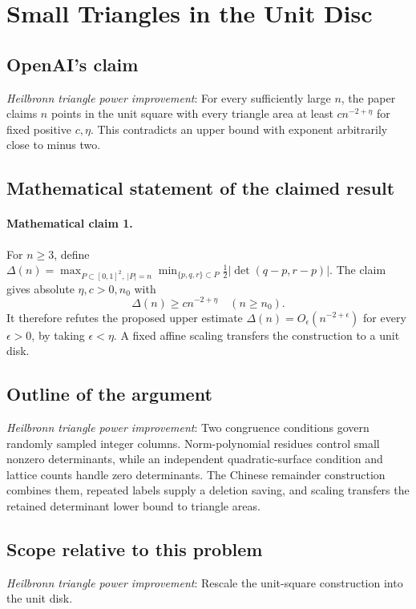 \documentclass[11pt]{article}
\begin{document}
\section*{Small Triangles in the Unit Disc}

\subsection{OpenAI's claim}
\textit{Heilbronn triangle power improvement}: For every sufficiently large $n$, the paper claims $n$ points in the unit square with every triangle area at least $c n^{-2+\eta}$ for fixed positive $c,\eta$. This contradicts an upper bound with exponent arbitrarily close to minus two.

\subsection{Mathematical statement of the claimed result}
\paragraph{Mathematical claim 1.} For $n\ge3$, define $\Delta(n)=\max_{P\subset[0,1]^2,\ |P|=n}\min_{\{p,q,r\}\subset P}\tfrac12|\det(q-p,r-p)|$. The claim gives absolute $\eta,c>0,n_0$ with \[\Delta(n)\ge cn^{-2+\eta}\quad(n\ge n_0).\] It therefore refutes the proposed upper estimate $\Delta(n)=O_\epsilon(n^{-2+\epsilon})$ for every $\epsilon>0$, by taking $\epsilon<\eta$. A fixed affine scaling transfers the construction to a unit disk.

\subsection{Outline of the argument}
\textit{Heilbronn triangle power improvement}: Two congruence conditions govern randomly sampled integer columns. Norm-polynomial residues control small nonzero determinants, while an independent quadratic-surface condition and lattice counts handle zero determinants. The Chinese remainder construction combines them, repeated labels supply a deletion saving, and scaling transfers the retained determinant lower bound to triangle areas.

\subsection{Scope relative to this problem}
\textit{Heilbronn triangle power improvement}: Rescale the unit-square construction into the unit disk.
\end{document}
